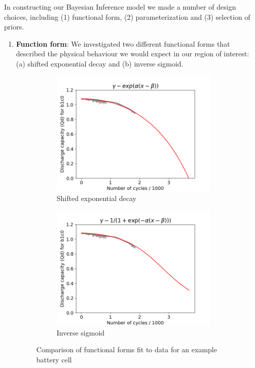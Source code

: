\documentclass{article}
\begin{document}
In constructing our Bayesian Inference model we made a number of design choices, including (1) functional form, (2) parameterization and (3) selection of priors.

\begin{enumerate}[label=(\alph*), leftmargin=.35in]
    \item \textbf{Function form}: We investigated two different functional forms that described the physical behaviour we would expect in our region of interest: (a) shifted exponential decay and (b) inverse sigmoid.

    \begin{figure}[H]
        \centering
        \begin{subfigure}[b]{0.49\linewidth}
            \includegraphics[height=6cm, width=\linewidth]{figs/example_exponetial_decay.png}
            \caption{Shifted exponential decay}
        \end{subfigure}
        \begin{subfigure}[b]{0.49\linewidth}
            \includegraphics[height=6cm, width=\linewidth]{figs/example_inv_sigmoid.png}
            \caption{Inverse sigmoid}
        \end{subfigure}
        \caption{Comparison of functional forms fit to data for an example battery cell}
        \label{fig:funcforms}
    \end{figure}


\end{enumerate}
\end{document}
